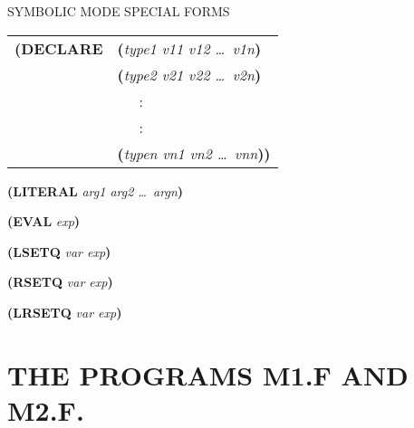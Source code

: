 \begin{describe}{SYMBOLIC MODE SPECIAL FORMS}
\begin{tabular}{ll}
{\bf (DECLARE} & {\bf (}{\it type1 v11 v12 \dots\  v1n\/}{\bf )}\\
& {\bf (}{\it type2 v21 v22 \dots\  v2n\/}{\bf )}\\
& \ \ \ :\\
& \ \ \ :\\
& {\bf (}{\it typen vn1 vn2 \dots\  vnn\/}{\bf ))}\\
\end{tabular}

{\bf (LITERAL} {\it arg1 arg2 \dots\  argn\/}{\bf )}

{\bf (EVAL} {\it exp\/}{\bf )}

{\bf (LSETQ} {\it var exp\/}{\bf )}

{\bf (RSETQ} {\it var exp\/}{\bf )}

{\bf (LRSETQ} {\it var exp\/}{\bf )}
\end{describe}

\chapter{THE PROGRAMS M1.F AND M2.F.}

